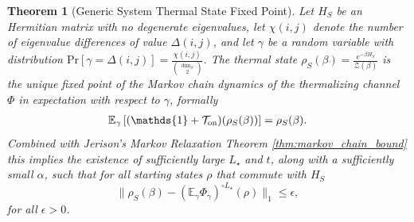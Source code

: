 \documentclass{article}
\newtheorem{theorem}{Theorem}
\newcommand{\on}{\rm on}
\newcommand{\norm}[1]{\| #1 \|}
\newcommand{\prob}[1]{\text{Pr}\left[ #1 \right]}
\newcommand{\partfun}{\mathcal{Z}}
\newcommand{\identity}{\mathds{1}}
\begin{document}
\begin{theorem}[Generic System Thermal State Fixed Point]
    Let $H_S$ be an Hermitian matrix with no degenerate eigenvalues, let $\chi(i,j)$ denote the number of eigenvalue differences of value $\Delta(i,j)$, and let $\gamma$ be a random variable with distribution $\prob{\gamma = \Delta(i,j)} = \frac{\chi(i,j)}{\binom{\dim_S}{2}}$. The thermal state $\rho_S(\beta) = \frac{e^{-\beta H_S}}{\partfun(\beta)}$ is the unique fixed point of the Markov chain dynamics of the thermalizing channel $\Phi$ in expectation with respect to $\gamma$, formally
    \begin{align}
        \mathbb{E}_{\gamma} \left[ (\identity + \mathcal{T}_{\on})(\rho_S(\beta)) \right] = \rho_S(\beta).
    \end{align}
    Combined with Jerison's Markov Relaxation Theorem \ref{thm:markov_chain_bound} this implies the existence of sufficiently large $L_\star$ and $t$, along with a sufficiently small $\alpha$, such that for all starting states $\rho$ that commute with $H_S$
    \begin{equation}
    \norm{\rho_S(\beta) - (\mathbb{E}_\gamma \Phi_\gamma)^{\circ L_\star}(\rho)}_1 \le \epsilon,
    \end{equation}
    for all $\epsilon > 0$.
\end{theorem}
\end{document}

